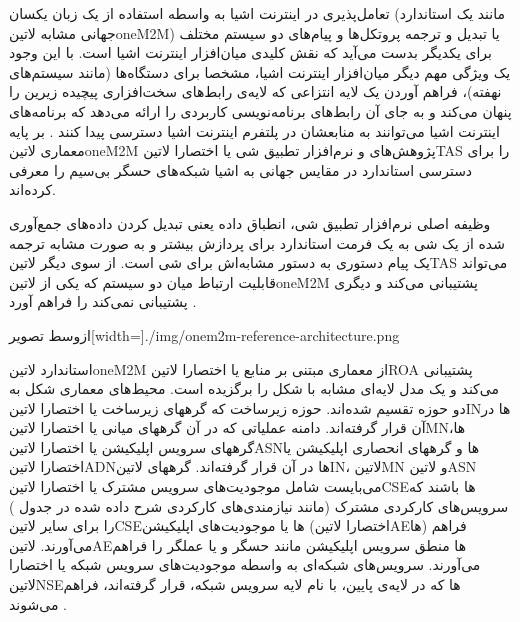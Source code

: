 تعامل‌پذیری در اینترنت اشیا به واسطه استفاده از یک زبان یکسان (مانند یک استاندارد جهانی مشابه ‌لاتین{oneM2M})
یا تبدیل و ترجمه پروتکل‌ها و پیام‌های دو سیستم مختلف برای یکدیگر بدست می‌آید که نقش کلیدی میان‌افزار اینترنت اشیا است.
با این وجود یک ویژگی مهم دیگر میان‌افزار اینترنت اشیا، مشخصا برای دستگاه‌ها (مانند سیستم‌های نهفته)، فراهم آوردن یک لایه انتزاعی که لایه‌ی رابط‌های سخت‌افزاری پیچیده زیرین را پنهان می‌کند
و به جای آن رابط‌های برنامه‌نویسی کاربردی را ارائه می‌دهد که برنامه‌های اینترنت اشیا می‌توانند به منابعشان در پلتفرم اینترنت اشیا دسترسی پیدا کنند
.
بر پایه معماری ‌لاتین{oneM2M} پژوهش‌های  و  نرم‌افزار تطبیق شی یا اختصارا ‌لاتین{TAS} را برای دسترسی استاندارد در مقایس جهانی به اشیا شبکه‌های حسگر بی‌سیم
را معرفی کرده‌اند.

وظیفه اصلی نرم‌افزار تطبیق شی، انطباق داده یعنی تبدیل کردن داده‌های جمع‌آوری شده از یک شی به یک فرمت استاندارد برای پردازش بیشتر و به صورت مشابه
ترجمه یک پیام دستوری به دستور مشابه‌اش برای شی است.
از سوی دیگر ‌لاتین{TAS} می‌تواند قابلیت ارتباط میان دو سیستم که یکی از ‌لاتین{oneM2M} پشتیبانی می‌کند و
دیگری پشتیبانی نمی‌کند را فراهم آورد
.

‌ازوسط
‌تصویر[width=\textwidth]{./img/onem2m-reference-architecture.png}

استاندارد ‌لاتین{oneM2M} از معماری مبتنی بر منابع یا اختصارا ‌لاتین{ROA} پشتیبانی می‌کند و یک مدل لایه‌ای مشابه با شکل  را برگزیده است.
محیط‌های معماری شکل  به دو حوزه تقسیم شده‌اند. حوزه زیرساخت که گرههای زیرساخت یا اختصارا ‌لاتین{IN}ها در آن قرار گرفته‌اند.
دامنه عملیاتی که در آن گرههای میانی یا اختصارا ‌لاتین{MN}ها، گرههای سرویس اپلیکیشن یا اختصارا ‌لاتین{ASN}ها و گرههای انحصاری اپلیکیشن یا اختصارا ‌لاتین{ADN}ها
در آن قرار گرفته‌اند.
گرههای ‌لاتین{IN}، ‌لاتین{MN} و ‌لاتین{ASN} می‌بایست شامل موجودیت‌های سرویس مشترک یا اختصارا ‌لاتین{CSE}ها باشند که سرویس‌های کارکردی مشترک
(مانند نیازمندی‌های کارکردی شرح داده شده در جدول )
را برای سایر ‌لاتین{CSE}ها یا موجودیت‌های اپلیکیشن (اختصارا ‌لاتین{AE}ها)
فراهم می‌آورند.
‌لاتین{AE}ها منطق سرویس اپلیکیشن مانند حسگر و یا عملگر را فراهم می‌آورند.
سرویس‌های شبکه‌ای به واسطه موجودیت‌های سرویس شبکه یا اختصارا ‌لاتین{NSE}ها که در لایه‌ی پایین، با نام لایه سرویس شبکه، قرار گرفته‌اند، فراهم می‌شوند
.

